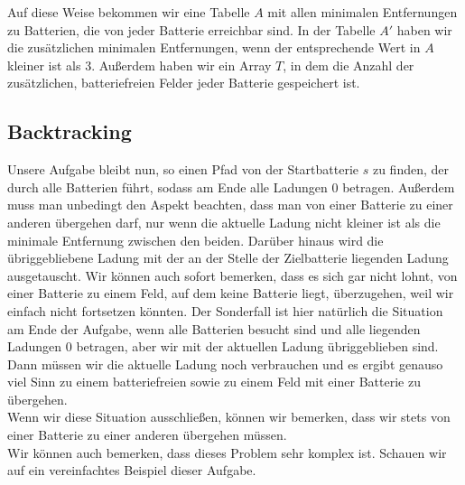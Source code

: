 \documentclass[a4paper,10pt,ngerman]{scrartcl}
\begin{document}
Auf diese Weise bekommen wir eine Tabelle $A$ mit allen minimalen Entfernungen zu Batterien, die von jeder Batterie
erreichbar sind. In der Tabelle $A'$ haben wir die zusätzlichen minimalen Entfernungen,
wenn der entsprechende Wert in $A$ kleiner ist als 3. Außerdem haben wir ein Array $T$, in dem die 
Anzahl der zusätzlichen, batteriefreien Felder jeder Batterie gespeichert ist.

\subsection{Backtracking}
Unsere Aufgabe bleibt nun, so einen Pfad von der Startbatterie $s$ zu finden, der durch alle Batterien führt,
sodass am Ende alle Ladungen 0
betragen.
Außerdem muss man unbedingt den Aspekt beachten, dass man von einer Batterie zu einer anderen übergehen darf, nur wenn
die aktuelle Ladung nicht kleiner ist als die minimale Entfernung zwischen den beiden.
Darüber hinaus wird die übriggebliebene Ladung mit der an der Stelle der Zielbatterie liegenden Ladung ausgetauscht.
Wir können auch sofort bemerken, dass es sich gar nicht lohnt, von einer Batterie zu einem Feld, auf dem keine Batterie
liegt, überzugehen, weil wir einfach nicht fortsetzen könnten. Der Sonderfall ist hier natürlich die Situation am
Ende der Aufgabe, wenn alle Batterien besucht sind und alle liegenden Ladungen 0 betragen, aber wir mit der aktuellen Ladung übriggeblieben sind.
Dann müssen wir die aktuelle Ladung noch verbrauchen und es ergibt genauso viel Sinn zu einem batteriefreien sowie zu einem Feld mit einer Batterie
zu übergehen.\\
Wenn wir diese Situation ausschließen, können wir bemerken, dass wir stets von einer Batterie zu einer anderen übergehen müssen.\\
Wir können auch bemerken, dass dieses Problem sehr komplex ist. Schauen wir auf ein vereinfachtes Beispiel dieser Aufgabe.
\end{document}
